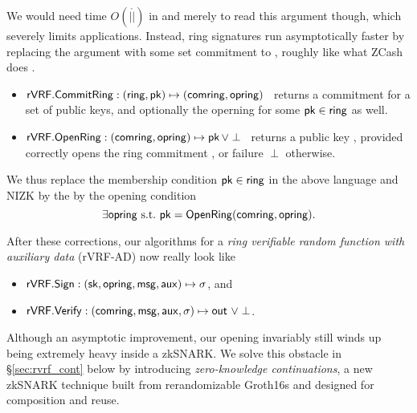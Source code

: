 
We would need time $O(|\ring|)$ in \rSign and \rVerify merely to read
this \ring argument though, which severely limits applications.  Instead,
ring signatures run asymptotically faster by replacing the \ring argument
with some set commitment to \ring, roughly like what ZCash does \cite{zcash_protocol}.
\begin{itemize}
\item ${\mathsf{rVRF}}.{\mathsf{CommitRing}} : (\mathsf{ring},\mathsf{pk}) \mapsto (\mathsf{comring},\mathsf{opring})$ \,
    returns a commitment for a set \ring of public keys, and
    optionally the operning \openring for some $\mathsf{pk} \in \mathsf{ring}$ as well.
\item ${\mathsf{rVRF}}.{\mathsf{OpenRing}} : (\mathsf{comring},\mathsf{opring}) \mapsto \mathsf{pk} \, \lor \perp$ \,
    returns a public key \pk, provided \openring correctly opens
    the ring commitment \comring, or failure $\perp$ otherwise.
\end{itemize}

We thus replace the membership condition $\mathsf{pk} \in \mathsf{ring}$ in the above
language and NIZK by the by the opening condition
$$ \exists \mathsf{opring} \textrm{\ s.t.\ } \mathsf{pk} = {\mathsf{OpenRing}}(\mathsf{comring},\mathsf{opring}) . $$
%


After these corrections,  our algorithms for a
{\em ring verifiable random function with auxiliary data} (rVRF-AD)
now really look like
\begin{itemize}
\item ${\mathsf{rVRF}}.{\mathsf{Sign}} : (\mathsf{sk},\mathsf{opring},\mathsf{msg},\mathsf{aux}) \mapsto \sigma$, \quad and
\item ${\mathsf{rVRF}}.{\mathsf{Verify}} : (\mathsf{comring},\mathsf{msg},\mathsf{aux},\sigma) \mapsto {\ensuremath{\mathsf{out}}} \,\, \lor \perp$.
\end{itemize}

Although an asymptotic improvement, our opening \OpenRing invariably
still winds up being extremely heavy inside a zkSNARK.
We solve this obstacle in \S\ref{sec:rvrf_cont} below by introducing
{\em zero-knowledge continuations}, a new zkSNARK technique built from
rerandomizable Groth16s \cite{Groth16} and designed for composition and reuse.


